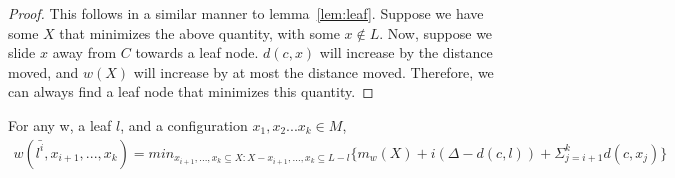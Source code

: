 \begin{proof}
    This follows in a similar manner to lemma~\ref{lem:leaf}. Suppose we have some $X$ that minimizes the above quantity, with some $x \not \in L$. Now, suppose we slide $x$ away from $C$ towards a leaf node. $d(c, x)$ will increase by the distance moved, and $w(X)$ will increase by at most the distance moved. Therefore, we can always find a leaf node that minimizes this quantity.
\end{proof}

\begin{lemma}
    For any w, a leaf $l$, and a configuration $x_1, x_2 ... x_k \in M$, 
    \begin{equation*}
        \begin{gathered}
            w(\bar{l^i}, x_{i+1}, ..., x_k) = min_{x_{i+1}, ..., x_k \subseteq X : X - x_{i+1}, ... , x_k \subseteq L - l}\{ m_w(X) + i(\Delta - d(c, l)) + \Sigma_{j=i+1} ^ k d(c, x_j)\}
        \end{gathered}
    \end{equation*}
\end{lemma}

